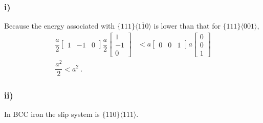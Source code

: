 \documentclass[a4paper]{article}
\begin{document}
	\subsubsection{i)}\label{sss:csl}
	Because the energy associated with $ \{111\} \langle 1\overline{1}0 \rangle $ is lower than that for $ \{111\} \langle 001 \rangle $,
	\begin{subequations}
		\begin{align}
			\dfrac{a}{2}
			\begin{bmatrix}
			1 & -1 & 0
			\end{bmatrix}
			\dfrac{a}{2}
			\begin{bmatrix}
			1 \\ -1 \\ 0
			\end{bmatrix}
			&<
			a
			\begin{bmatrix}
			0 & 0 & 1
			\end{bmatrix}
			a
			\begin{bmatrix}
			0 \\ 0 \\ 1
			\end{bmatrix} \\
			\dfrac{a^{2}}{2} < a^{2}~.
		\end{align}
	\end{subequations}
	\subsubsection{ii)}
	In BCC iron the slip system is $ \{110\} \langle \overline{1}11 \rangle $.
\end{document}

